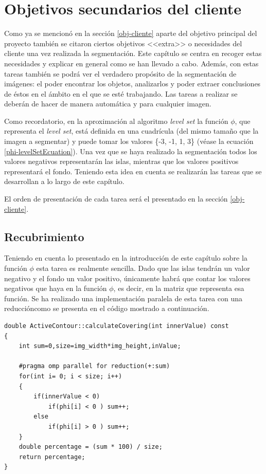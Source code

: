 \chapter{Objetivos secundarios del cliente}

Como ya se mencion\'{o} en la secci\'{o}n \ref{obj-cliente} aparte del objetivo principal del proyecto tambi\'{e}n se citaron ciertos objetivos <<extra>> o necesidades del cliente una vez realizada la segmentaci\'{o}n. Este cap\'{i}tulo se centra en recoger estas necesidades y explicar en general como se han llevado a cabo. Adem\'{a}s, con estas tareas tambi\'{e}n se podr\'{a} ver el verdadero prop\'{o}sito de la segmentaci\'{o}n de im\'{a}genes: el poder encontrar los objetos, analizarlos y poder extraer conclusiones de \'{e}stos en el \'{a}mbito en el que se est\'{e} trabajando. Las tareas a realizar se deber\'{a}n de hacer de manera autom\'{a}tica y para cualquier imagen.

Como recordatorio, en la aproximaci\'{o}n al algoritmo \textit{level set} la funci\'{o}n $\phi$, que representa el \textit{level set}, est\'{a} definida en una cuadr\'{i}cula (del mismo tama\~{n}o que la imagen a segmentar) y puede tomar los valores \{-3, -1, 1, 3\} (v\'{e}ase la ecuaci\'{o}n \ref{phi-levelSetEcuation}). Una vez que se haya realizado la segmentaci\'{o}n todos los valores negativos representar\'{a}n las islas, mientras que los valores positivos representar\'{a} el fondo. Teniendo esta idea en cuenta se realizar\'{a}n las tareas que se desarrollan a lo largo de este cap\'{i}tulo.

El orden de presentaci\'{o}n de cada tarea ser\'{a} el presentado en la secci\'{o}n \ref{obj-cliente}.
\section{Recubrimiento}

Teniendo en cuenta lo presentado en la introducci\'{o}n de este cap\'{i}tulo sobre la funci\'{o}n $\phi$ esta tarea es realmente sencilla. Dado que las islas tendr\'{a}n un valor negativo y el fondo un valor positivo, \'{u}nicamente habr\'{a} que contar los valores negativos que haya en la funci\'{o}n $\phi$, es decir, en la matriz que representa esa funci\'{o}n. Se ha realizado una implementaci\'{o}n paralela de esta tarea con una reducci\'{o}n\protect\footnotemark como se presenta en el c\'{o}digo mostrado a continuaci\'{o}n. 
\begin{lstlisting}
double ActiveContour::calculateCovering(int innerValue) const
{
	int sum=0,size=img_width*img_height,inValue;
	
	#pragma omp parallel for reduction(+:sum)
	for(int i= 0; i < size; i++)
	{
		if(innerValue < 0)
			if(phi[i] < 0 )	sum++;
		else
			if(phi[i] > 0 )	sum++;
	}
	double percentage = (sum * 100) / size;
	return percentage;
}	
\end{lstlisting}
